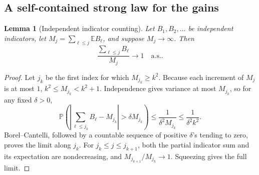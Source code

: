 \documentclass[11pt,letterpaper]{article}
\newtheorem{lemma}[theorem]{Lemma}
\theoremstyle{definition}
\newcommand{\E}{\mathbb E}
\newcommand{\Prb}{\mathbb P}
\newcommand{\as}{\text{a.s.}}
\begin{document}
\subsection{A self-contained strong law for the gains}

\begin{lemma}[Independent indicator counting]
\label{mbg:qry:lem:counting}
Let \(B_1,B_2,\ldots\) be independent indicators, let
\(M_j=\sum_{\ell\le j}\E B_\ell\), and suppose \(M_j\to\infty\).
Then
\[
 \frac{\sum_{\ell\le j}B_\ell}{M_j}\longrightarrow1
 \quad\as.
\]
\end{lemma}

\begin{proof}
Let \(j_k\) be the first index for which \(M_{j_k}\ge k^2\).
Because each increment of \(M_j\) is at most \(1\),
\(k^2\le M_{j_k}<k^2+1\). Independence gives variance at most
\(M_{j_k}\), so for any fixed \(\delta>0\),
\[
 \Prb\left(\left|\sum_{\ell\le j_k}B_\ell-M_{j_k}\right|
             >\delta M_{j_k}\right)
 \le\frac{1}{\delta^2M_{j_k}}
 \le\frac{1}{\delta^2k^2}.
\]
Borel--Cantelli, followed by a countable sequence of positive
\(\delta\)'s tending to zero, proves the limit along \(j_k\).
For \(j_k\le j\le j_{k+1}\), both the partial indicator sum and its
expectation are nondecreasing, and
\(M_{j_{k+1}}/M_{j_k}\to1\). Squeezing gives the full limit.
\end{proof}
\end{document}
